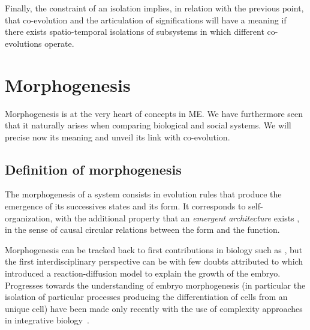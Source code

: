 \documentclass[letterpaper]{article}
\begin{document}
Finally, the constraint of an isolation implies, in relation with the previous point, that co-evolution and the articulation of significations will have a meaning if there exists spatio-temporal isolations of subsystems in which different co-evolutions operate.






\section{Morphogenesis}


Morphogenesis is at the very heart of concepts in ME. We have furthermore seen that it naturally arises when comparing biological and social systems. We will precise now its meaning and unveil its link with co-evolution.


\subsection{Definition of morphogenesis}


The morphogenesis of a system consists in evolution rules that produce the emergence of its successives states and its form. It corresponds to self-organization, with the additional property that an \emph{emergent architecture} exists \citep{doursat2012morphogenetic}, in the sense of causal circular relations between the form and the function.



Morphogenesis can be tracked back to first contributions in biology such as \citep{thompson1942growth}, but the first interdisciplinary perspective can be with few doubts attributed to \cite{Turing1952} which introduced a reaction-diffusion model to explain the growth of the embryo. Progresses towards the understanding of embryo morphogenesis (in particular the isolation of particular processes producing the differentiation of cells from an unique cell) have been made only recently with the use of complexity approaches in integrative biology~\citep{delile2016chapitre}.
\end{document}
